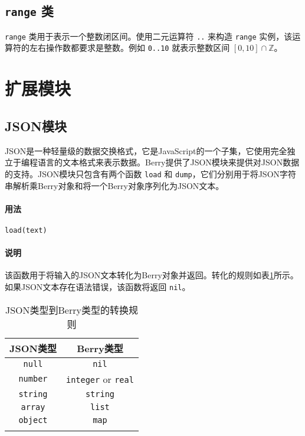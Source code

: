 \subsection{\texttt{range} 类}

\texttt{range} 类用于表示一个整数闭区间。使用二元运算符 \texttt{..} 来构造 \texttt{range} 实例，该运算符的左右操作数都要求是整数。例如 \texttt{0..10} 就表示整数区间 $[0,10]\cap\mathbb{Z}$。

\section{扩展模块}
\subsection{JSON模块}

JSON是一种轻量级的数据交换格式，它是JavaScript的一个子集，它使用完全独立于编程语言的文本格式来表示数据。Berry提供了JSON模块来提供对JSON数据的支持。JSON模块只包含有两个函数 \texttt{load} 和 \texttt{dump}，它们分别用于将JSON字符串解析乘Berry对象和将一个Berry对象序列化为JSON文本。


\paragraph{用法}
\begin{lstlisting}[language=berry, numbers=none]
load(text)
\end{lstlisting}

\paragraph{说明}
该函数用于将输入的JSON文本转化为Berry对象并返回。转化的规则如表\ref{tab::json2berry_rule}所示。如果JSON文本存在语法错误，该函数将返回 \texttt{nil}。
\begin{table}[htb]
    \centering
    \setlength{\tabcolsep}{18mm}
    \begin{tabular}{cc} \Xhline{1pt}
        \textbf{JSON类型} & \textbf{Berry类型} \\ \hline
        \texttt{null} & \texttt{nil} \\
        \texttt{number} & \texttt{integer} or \texttt{real} \\
        \texttt{string} & \texttt{string} \\
        \texttt{array} & \texttt{list} \\
        \texttt{object} & \texttt{map} \\
        \Xhline{1pt}
    \end{tabular}
    \caption{JSON类型到Berry类型的转换规则}
    \label{tab::json2berry_rule}
\end{table}

